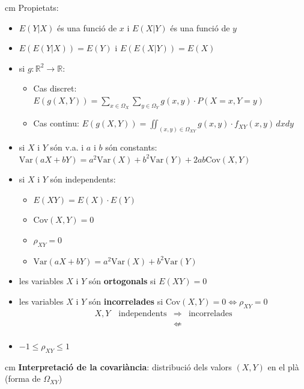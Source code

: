 \documentclass{article}
\newcommand\R{\mathbb{R}}
\begin{document}
 cm
Propietats:
\begin{itemize}
\item $E(Y|X)$ \'es una funci\'o de $x$ i $E(X|Y)$ \'es una funci\'o de $y$

\item $E(E(Y|X))=E(Y)$ i $E(E(X|Y))=E(X)$

\item si $g:\R^2 \rightarrow \R$:
\begin{itemize}
\item Cas discret: $\displaystyle E(g(X, Y))=\sum_{x \in \Omega_X} \sum_{y \in \Omega_Y} g(x, y) \cdot P(X=x, Y=y)$
\item Cas continu: $\displaystyle E(g(X, Y))=\iint_{(x, y) \in \Omega_{XY}} g(x, y) \cdot f_{XY}(x, y) \, dxdy$
\end{itemize}

\item si $X$ i $Y$ s\'on v.a. i $a$ i $b$ s\'on constants:
$\mathrm{Var}(aX+bY)=a^2 \mathrm{Var}(X)+b^2\mathrm{Var}(Y)+2ab\mathrm{Cov}(X, Y)$

\item si $X$ i $Y$ s\'on independents:
\begin{itemize}
\item $E(XY)=E(X) \cdot E(Y)$
\item $\mathrm{Cov}(X, Y)=0$
\item $\rho_{XY}=0$
\item $\mathrm{Var}(aX+bY)=a^2 \mathrm{Var}(X)+b^2\mathrm{Var}(Y)$
\end{itemize}

\item les variables $X$ i $Y$ s\'on \textbf{ortogonals} si $E(XY)=0$
\item les variables $X$ i $Y$ s\'on \textbf{incorrelades} si 
$\mathrm{Cov}(X, Y)=0  \Leftrightarrow \rho_{XY}=0$
\[
\begin{array}{rcl}
X, Y \quad \text{independents}  & \Rightarrow &  \text{incorrelades}\\
                                & \nLeftarrow & \\
\end{array}
\]

\item $-1 \leq \rho_{XY} \leq 1$
\end{itemize}

 cm
\textbf{Interpretaci\'o de la covari\`ancia}: distribuci\'o dels valors $(X, Y)$ en el pl\`a
(forma de $\Omega_{XY}$) 
\end{document}
